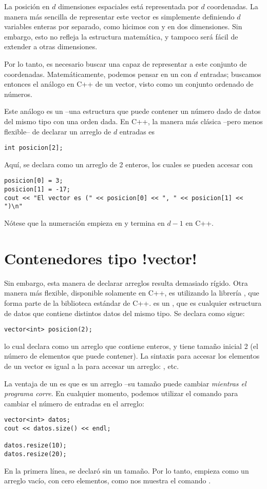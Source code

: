 La posición en $d$ dimensiones espaciales está representada por $d$ coordenadas.
La manera más sencilla de representar este vector es simplemente definiendo $d$ 
variables enteras por separado, como hicimos con  y  en dos
dimensiones. Sin embargo, esto no refleja la
estructura matemática, y tampoco será fácil de extender a otras dimensiones.

Por lo tanto, es necesario buscar una  capaz de
representar a este conjunto de coordenadas. Matemáticamente, podemos pensar en
un  con $d$ entradas; buscamos entonces el análogo en C++ de un
vector, visto como un conjunto ordenado de números.

Este análogo es un  --una estructura que puede contener un número
dado de  datos
del mismo tipo con una orden dada. 
En C++, la manera más clásica --pero menos flexible-- de declarar un
arreglo de $d$
entradas es
\begin{lstlisting}
int posicion[2];
\end{lstlisting}
Aquí,  se declara como un arreglo de 2 enteros, los cuales se
pueden accesar con
\begin{lstlisting}
posicion[0] = 3;
posicion[1] = -17;
cout << "El vector es (" << posicion[0] << ", " << posicion[1] << ")\n"
\end{lstlisting}
Nótese que la numeración empieza en  y termina en $d-1$ en C++.

\section{Contenedores tipo \inl!vector!}

Sin embargo, esta manera de declarar  arreglos resulta demasiado rígido.
Otra manera más flexible, disponible solamente en C++, es utilizando
la librería , que forma parte de la biblioteca estándar de C++. 
 es un , que es cualquier estructura de datos que
contiene distintos datos del mismo tipo. Se declara como sigue:
\begin{lstlisting}
vector<int> posicion(2);
\end{lstlisting}
lo cual declara  como un arreglo que contiene enteros, y
tiene
tamaño inicial 2 (el número de elementos que puede contener).
La sintaxis para accesar los elementos de un vector es igual a la para accesar
un arreglo: , etc.  

La ventaja de un  es que es un arreglo  --su tamaño
puede cambiar \emph{mientras el
programa corre}. En cualquier momento, podemos utilizar el comando 
para cambiar el número de entradas en el arreglo:
\begin{lstlisting}
vector<int> datos;
cout << datos.size() << endl;

datos.resize(10);
datos.resize(20);
\end{lstlisting}
En la primera línea, se declaró  sin un tamaño. Por lo tanto,
empieza como un arreglo vacío, con cero elementos, como nos muestra el comando
.


